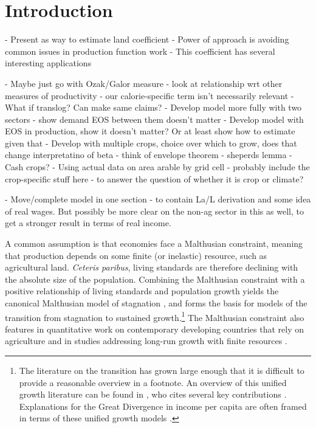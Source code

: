 \documentclass[11pt]{article}
\begin{document}
\pagebreak 

\section{Introduction}
\onehalfspacing 

- Present as way to estimate land coefficient
- Power of approach is avoiding common issues in production function work
- This coefficient has several interesting applications

- Maybe just go with Ozak/Galor measure - look at relationship wrt other measures of productivity - our calorie-specific term isn't necessarily relevant
- What if translog? Can make same claims? 
- Develop model more fully with two sectors - show demand EOS between them doesn't matter
- Develop model with EOS in production, show it doesn't matter? Or at least show how to estimate given that
- Develop with multiple crops, choice over which to grow, does that change interpretatino of beta - think of envelope theorem - sheperds lemma
- Cash crops? 
- Using actual data on area arable by grid cell - probably include the crop-specific stuff here - to answer the question of whether it is crop or climate?

- Move/complete model in one section - to contain La/L derivation and some idea of real wages. But possibly be more clear on the non-ag sector in this as well, to get a stronger result in terms of real income. 


A common assumption is that economies face a Malthusian constraint, meaning that production depends on some finite (or inelastic) resource, such as agricultural land. \textit{Ceteris paribus}, living standards are therefore declining with the absolute size of the population. Combining the Malthusian constraint with a positive relationship of living standards and population growth yields the canonical Malthusian model of stagnation \citep{ashraf2010dynamics}, and forms the basis for models of the transition from stagnation to sustained growth.\footnote{The literature on the transition has grown large enough that it is difficult to provide a reasonable overview in a footnote. An overview of this unified growth literature can be found in \citet{Galor:2011uq}, who cites several key contributions \citep{gw00,galor2002natural,Hansen:2002fk,doepke2004accounting,cs2005,lagerlof2006,craftsmills2009,strulik2008population}. Explanations for the Great Divergence in income per capita are often framed in terms of these unified growth models \citep{kp2001,galor2008trading,vollrath2011,vv08,vv13,cs2015}.} The Malthusian constraint also features in quantitative work on contemporary developing countries that rely on agriculture \citep{Gollin:2007oq,Restuccia:2008hc,weilwilde2009,Gollin:2010ys} and in studies addressing long-run growth with finite resources \citep{perettovalente2015}.
\end{document}
